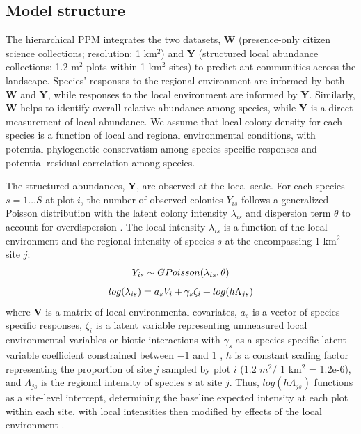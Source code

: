 \documentclass[preprint,review,times,12pt,3p]{elsarticle}
\begin{document}
\subsection{Model structure}
The hierarchical PPM integrates the two datasets, \textbf{W} (presence-only citizen science collections; resolution: 1 km$^2$) and \textbf{Y} (structured local abundance collections; 1.2 m$^2$ plots within 1 km$^2$ sites) to predict ant communities across the landscape. Species' responses to the regional environment are informed by both \textbf{W} and \textbf{Y}, while responses to the local environment are informed by \textbf{Y}. Similarly, \textbf{W} helps to identify overall relative abundance among species, while \textbf{Y} is a direct measurement of local abundance. We assume that local colony density for each species is a function of local and regional environmental conditions, with potential phylogenetic conservatism among species-specific responses and potential residual correlation among species.

The structured abundances, \textbf{Y}, are observed at the local scale. For each species $s=1 \dots S$  at plot $i$, the number of observed colonies $Y_{is}$ follows a generalized Poisson distribution with the latent colony intensity $\lambda_{is}$ and dispersion term $\theta$ to account for overdispersion \citep{Consul1992,Ntzoufras2005,Isaac2019,Miller2019}. The local intensity $\lambda_{is}$ is a function of the local environment and the regional intensity of species $s$ at the encompassing 1 km$^2$ site $j$:
    \begin{equation}
        Y_{is} \sim GPoisson(\lambda_{is}, \theta) \\
        \label{eq:Y_GP}
    \end{equation}
    \begin{equation}
        log(\lambda_{is}) = a_s V_i + \gamma_s \zeta_i + log(h\Lambda_{js}) \\
        \label{eq:lambda}
    \end{equation}
where \textbf{V} is a matrix of local environmental covariates, $a_s$ is a vector of species-specific responses, $\zeta_i$ is a latent variable representing unmeasured local environmental variables or biotic interactions with $\gamma_s$ as a species-specific latent variable coefficient constrained between $-1$ and $1$ \citep{Ovaskainen2016,Caradima2019,Tobler2019}, $h$ is a constant scaling factor representing the proportion of site $j$ sampled by plot $i$ (1.2 $m^2 /$ 1 km$^2$ = 1.2e-6), and $\Lambda_{js}$ is the regional intensity of species $s$ at site $j$. Thus, $log(h\Lambda_{js})$ functions as a site-level intercept, determining the baseline expected intensity at each plot within each site, with local intensities then modified by effects of the local environment \citep{Yamaura2016,Miller2019}.
\end{document}

